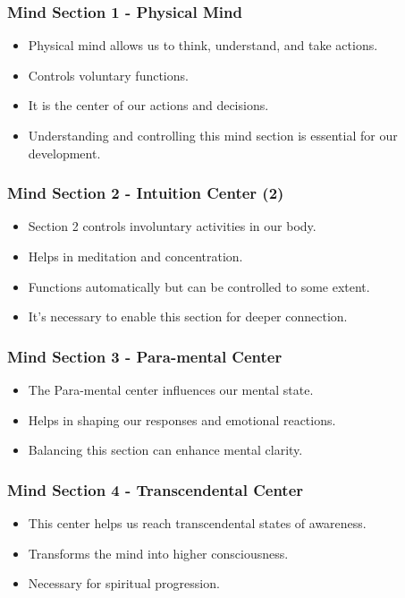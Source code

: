 \begin{frame}[fragile]\frametitle{Mind Section 1 - Physical Mind}
\begin{itemize}
    \item Physical mind allows us to think, understand, and take actions.
    \item Controls voluntary functions.
    \item It is the center of our actions and decisions.
    \item Understanding and controlling this mind section is essential for our development.
\end{itemize}
\end{frame}

\begin{frame}[fragile]\frametitle{Mind Section 2 - Intuition Center (2)}
\begin{itemize}
    \item Section 2 controls involuntary activities in our body.
    \item Helps in meditation and concentration.
    \item Functions automatically but can be controlled to some extent.
    \item It’s necessary to enable this section for deeper connection.
\end{itemize}
\end{frame}

\begin{frame}[fragile]\frametitle{Mind Section 3 - Para-mental Center}
\begin{itemize}
    \item The Para-mental center influences our mental state.
    \item Helps in shaping our responses and emotional reactions.
    \item Balancing this section can enhance mental clarity.
\end{itemize}
\end{frame}

\begin{frame}[fragile]\frametitle{Mind Section 4 - Transcendental Center}
\begin{itemize}
    \item This center helps us reach transcendental states of awareness.
    \item Transforms the mind into higher consciousness.
    \item Necessary for spiritual progression.
\end{itemize}
\end{frame}


